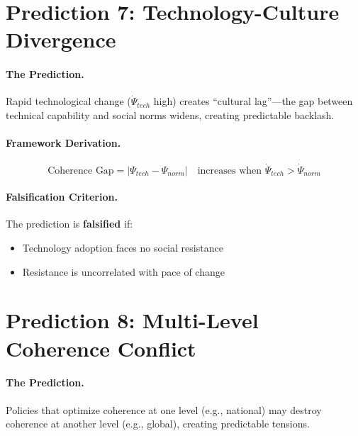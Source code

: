 \section{Prediction 7: Technology-Culture Divergence}
\label{sec:S-prediction7}

\paragraph{The Prediction.}
Rapid technological change ($\dot{\Psi}_{tech}$ high) creates ``cultural lag''---the gap between technical capability and social norms widens, creating predictable backlash.

\paragraph{Framework Derivation.}
\begin{equation}
    \text{Coherence Gap} = |\Psi_{tech} - \Psi_{norm}| \quad \text{increases when } \dot{\Psi}_{tech} > \dot{\Psi}_{norm}
\end{equation}

\paragraph{Falsification Criterion.}
The prediction is \textbf{falsified} if:
\begin{itemize}
    \item Technology adoption faces no social resistance
    \item Resistance is uncorrelated with pace of change
\end{itemize}


\section{Prediction 8: Multi-Level Coherence Conflict}
\label{sec:S-prediction8}

\paragraph{The Prediction.}
Policies that optimize coherence at one level (e.g., national) may destroy coherence at another level (e.g., global), creating predictable tensions.

